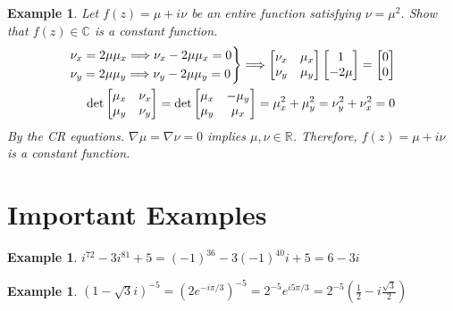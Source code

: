 \documentclass{article}
\newtheorem{example}[theorem]{Example}
\theoremstyle{definition}
\begin{document}
\begin{example} \normalfont
    Let $f(z) = \mu + i \nu$ be an entire function satisfying $\nu = \mu^2$. Show that $f(z) \in \mathbb{C}$ is a constant function.
    \begin{align*}
        \begin{rcases}
            \nu_x = 2 \mu \mu_x \Longrightarrow \nu_x - 2 \mu \mu_x = 0 \\
            \nu_y = 2 \mu \mu_y \Longrightarrow \nu_y - 2 \mu \mu_y = 0
        \end{rcases} \Longrightarrow
        \begin{bmatrix}
            \nu_x & \mu_x \\ \nu_y & \mu_y
        \end{bmatrix}
        \begin{bmatrix}
            1 \\ -2 \mu
        \end{bmatrix} =
        \begin{bmatrix}
            0 \\0
        \end{bmatrix} \\
        \det \begin{bmatrix}
            \mu_x & \nu_x \\ \mu_y & \nu_y
        \end{bmatrix} = \det \begin{bmatrix}
            \mu_x & -\mu_y \\ \mu_y & \mu_x
        \end{bmatrix} = \mu_x^2 + \mu_y^2 = \nu_y^2 + \nu_x^2 = 0
    \end{align*}
    By the CR equations. $\nabla \mu = \nabla \nu = 0$ implies $\mu, \nu \in \mathbb{R}$. Therefore, $f(z) = \mu + i \nu$ is a constant function.
\end{example}


\section{Important Examples}

\begin{example} \normalfont
    $i^{72} - 3i^{81} + 5 = (-1)^{36} - 3(-1)^{40}i + 5 = 6-3i$
\end{example}

\begin{example} \normalfont
    $(1 - \sqrt{3}i)^{-5} = (2e^{-i\pi/3})^{-5} = 2^{-5} e^{i 5 \pi/3} = 2^{-5} \left( \frac{1}{2} - i \frac{\sqrt{3}}{2} \right)$
\end{example}
\end{document}
